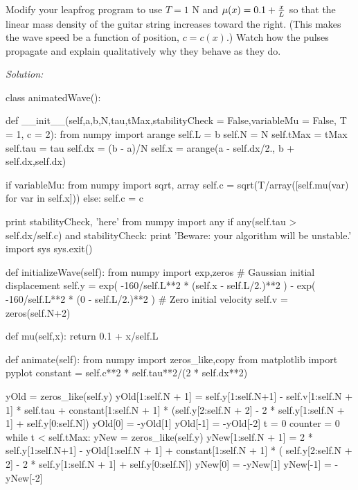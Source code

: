 \begin{enumerate}
\prob Modify your leapfrog program to use $T = 1$ N and $\mu(x) = 0.1 +
{x\over L}$ so that the linear mass density of the guitar string
increases toward the right. (This makes the wave speed be a function of position, $c=c(x)$.)
Watch how the pulses propagate and explain qualitatively why they behave
as they do.
\end{enumerate}
\ifsolutions
\textit{Solution:}\\
\begin{codeexample}
\begin{VerbatimOut}{\listingFile}

class animatedWave():

    def __init__(self,a,b,N,tau,tMax,stabilityCheck = False,variableMu = False, T = 1, c = 2):
        from numpy import arange
        self.L = b        
        self.N = N
        self.tMax = tMax
        self.tau = tau
        self.dx = (b - a)/N
        self.x = arange(a - self.dx/2., b + self.dx,self.dx)

        if variableMu:
            from numpy import sqrt, array
            self.c = sqrt(T/array([self.mu(var) for var in self.x]))
        else: 
            self.c = c

        print stabilityCheck, 'here'
        from numpy import any
        if any(self.tau > self.dx/self.c) and stabilityCheck:
            print 'Beware: your algorithm will be unstable.'
            import sys
            sys.exit()


    def initializeWave(self):
        from numpy import exp,zeros
        # Gaussian initial displacement
        self.y = exp( -160/self.L**2 * (self.x - self.L/2.)**2 ) - exp( -160/self.L**2 * (0 - self.L/2.)**2 )
        # Zero initial velocity
        self.v = zeros(self.N+2)

    def mu(self,x):
        return 0.1 + x/self.L

    def animate(self):
        from numpy import zeros_like,copy
        from matplotlib import pyplot
        constant = self.c**2 * self.tau**2/(2 * self.dx**2)

        yOld = zeros_like(self.y)
        yOld[1:self.N + 1] = self.y[1:self.N+1] - self.v[1:self.N + 1] * self.tau + constant[1:self.N + 1] * (self.y[2:self.N + 2] - 2 * self.y[1:self.N + 1] + self.y[0:self.N])
        yOld[0] = -yOld[1]
        yOld[-1] = -yOld[-2]
        t = 0
        counter = 0
        while t < self.tMax:
            yNew = zeros_like(self.y)
            yNew[1:self.N + 1] = 2 * self.y[1:self.N+1] - yOld[1:self.N + 1] + constant[1:self.N + 1] * ( self.y[2:self.N + 2] - 2 * self.y[1:self.N + 1] + self.y[0:self.N])
            yNew[0] =  -yNew[1]
            yNew[-1] = - yNew[-2]


\end{VerbatimOut}
\end{codeexample}
